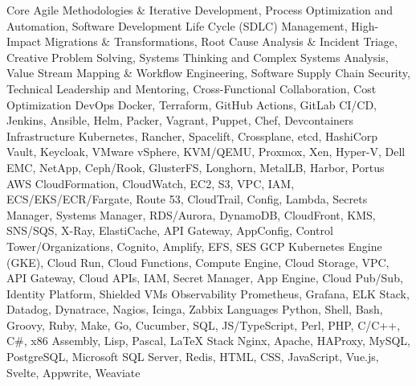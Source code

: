 \begin{cvskills}
    \cvskill
        { Core }
        {
          Agile Methodologies \& Iterative Development,
          Process Optimization and Automation,
          Software Development Life Cycle (SDLC) Management,
          High-Impact Migrations \& Transformations,
          Root Cause Analysis \& Incident Triage,
          Creative Problem Solving,
          Systems Thinking and Complex Systems Analysis,
          Value Stream Mapping \& Workflow Engineering,
          Software Supply Chain Security,
          Technical Leadership and Mentoring,
          Cross-Functional Collaboration,
          Cost Optimization
        }
    \cvskill
        { DevOps }
        {
          Docker,
          Terraform,
          GitHub Actions,
          GitLab CI/CD,
          Jenkins,
          Ansible,
          Helm,
          Packer,
          Vagrant,
          Puppet,
          Chef,
          Devcontainers
        }
    \cvskill
        { Infrastructure }
        {
          Kubernetes,
          Rancher,
          Spacelift,
          Crossplane,
          etcd,
          HashiCorp Vault,
          Keycloak,
          VMware vSphere,
          KVM/QEMU,
          Proxmox,
          Xen,
          Hyper-V,
          Dell EMC,
          NetApp,
          Ceph/Rook,
          GlusterFS,
          Longhorn,
          MetalLB,
          Harbor,
          Portus
        }
    \cvskill
        { AWS }
        {
          CloudFormation,
          CloudWatch,
          EC2,
          S3,
          VPC,
          IAM,
          ECS/EKS/ECR/Fargate,
          Route 53,
          CloudTrail,
          Config,
          Lambda,
          Secrets Manager,
          Systems Manager,
          RDS/Aurora,
          DynamoDB,
          CloudFront,
          KMS,
          SNS/SQS,
          X-Ray,
          ElastiCache,
          API Gateway,
          AppConfig,
          Control Tower/Organizations,
          Cognito,
          Amplify,
          EFS,
          SES
        }
    \cvskill
        { GCP }
        {
          Kubernetes Engine (GKE),
          Cloud Run,
          Cloud Functions,
          Compute Engine,
          Cloud Storage,
          VPC,
          API Gateway,
          Cloud APIs,
          IAM,
          Secret Manager,
          App Engine,
          Cloud Pub/Sub,
          Identity Platform,
          Shielded VMs
        }
    \cvskill
        { Observability }
        {
          Prometheus,
          Grafana,
          ELK Stack,
          Datadog,
          Dynatrace,
          Nagios,
          Icinga,
          Zabbix
        }
    \cvskill
        { Languages }
        {
          Python,
          Shell,
          Bash,
          Groovy,
          Ruby,
          Make,
          Go,
          Cucumber,
          SQL,
          JS/TypeScript,
          Perl,
          PHP,
          C/C++,
          C\#,
          x86 Assembly,
          Lisp,
          Pascal,
          LaTeX
        }
    \cvskill
        { Stack }
        {
          Nginx,
          Apache,
          HAProxy,
          MySQL,
          PostgreSQL,
          Microsoft SQL Server,
          Redis,
          HTML,
          CSS,
          JavaScript,
          Vue.js,
          Svelte,
          Appwrite,
          Weaviate
        }

\end{cvskills}

